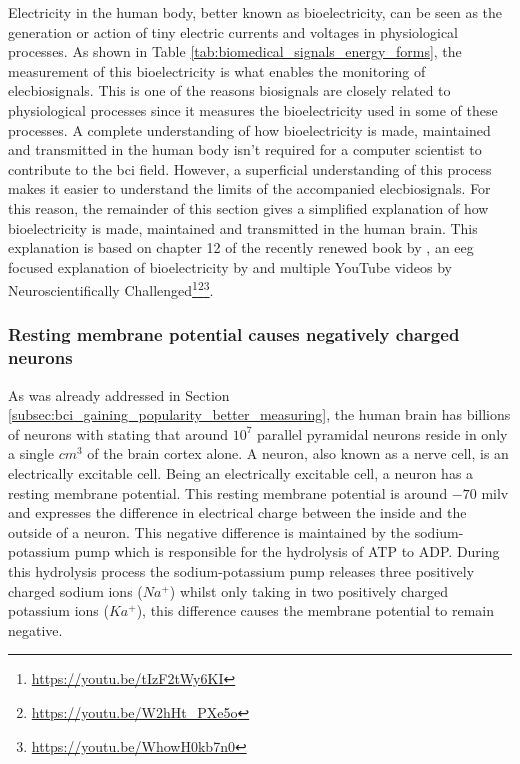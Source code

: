 Electricity in the human body, better known as bioelectricity, can be seen as the generation or action of tiny electric currents and voltages in physiological processes.
As shown in Table \ref{tab:biomedical_signals_energy_forms}, the measurement of this bioelectricity is what enables the monitoring of \glspl{elecbiosignal}.
This is one of the reasons \glspl{biosignal} are closely related to physiological processes since it measures the bioelectricity used in some of these processes.
A complete understanding of how bioelectricity is made, maintained and transmitted in the human body isn't required for a computer scientist to contribute to the \gls{bci} field.
However, a superficial understanding of this process makes it easier to understand the limits of the accompanied \glspl{elecbiosignal}.
For this reason, the remainder of this section gives a simplified explanation of how bioelectricity is made, maintained and transmitted in the human brain.
This explanation is based on chapter 12 of the recently renewed book by \citet{bioelec_book}, an \gls{eeg} focused explanation of bioelectricity by \citet{eeg_bioelec_creation} and multiple YouTube videos by Neuroscientifically Challenged\footnote{\url{https://youtu.be/tIzF2tWy6KI}}\footnote{\url{https://youtu.be/W2hHt_PXe5o}}\footnote{\url{https://youtu.be/WhowH0kb7n0}}.


\subsubsection{Resting membrane potential causes negatively charged neurons}
\label{subsubsec:biomedical_signals_biosignals_electrical_membrane_potential}

As was already addressed in Section \ref{subsec:bci_gaining_popularity_better_measuring}, the human brain has billions of neurons with \citet{neurons_book} stating that around $10^7$ parallel pyramidal neurons reside in only a single $cm^3$ of the brain cortex alone.
A neuron, also known as a nerve cell, is an electrically excitable cell.
Being an electrically excitable cell, a neuron has a resting membrane potential.
This resting membrane potential is around $-70$ \gls{milv} and expresses the difference in electrical charge between the inside and the outside of a neuron.
This negative difference is maintained by the sodium-potassium pump which is responsible for the hydrolysis of ATP to ADP.
During this hydrolysis process the sodium-potassium pump releases three positively charged sodium ions ($Na^+$) whilst only taking in two positively charged potassium ions ($Ka^+$), this difference causes the membrane potential to remain negative.

